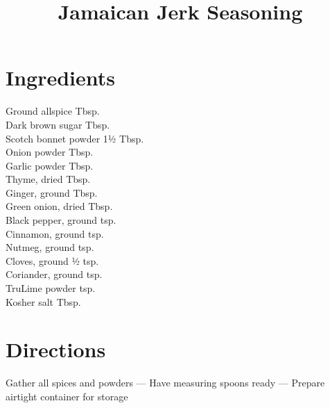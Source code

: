 \documentclass[11pt,letterpaper]{article}
\title{Jamaican Jerk Seasoning}
\author{}
\date{}
\begin{document}
\maketitle
\thispagestyle{empty}


\section*{Ingredients}
\setlength{\columnsep}{20pt}
\begin{multicols}{2}
\noindent
    Ground allspice  Tbsp. \\
    Dark brown sugar  Tbsp. \\
    Scotch bonnet powder \dotfill 1½ Tbsp. \\
    Onion powder  Tbsp. \\
    Garlic powder  Tbsp. \\
    Thyme, dried  Tbsp. \\
    Ginger, ground  Tbsp. \\
	\columnbreak
    Green onion, dried  Tbsp. \\
    Black pepper, ground  tsp. \\
    Cinnamon, ground  tsp. \\
    Nutmeg, ground  tsp. \\
    Cloves, ground \dotfill ½ tsp. \\
    Coriander, ground  tsp. \\
    TruLime powder  tsp. \\
    Kosher salt  Tbsp. \\
\end{multicols}

\section*{Directions}

\noindent
Gather all spices and powders ---
Have measuring spoons ready ---
Prepare airtight container for storage
\end{document}
